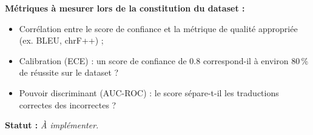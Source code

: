 \noindent\textbf{Métriques à mesurer lors de la constitution du dataset :}
\begin{itemize}
  \item Corrélation entre le score de confiance et la métrique de qualité
    appropriée (ex. BLEU, chrF++) ;
  \item Calibration (ECE) : un score de confiance de 0.8 correspond-il à
    environ 80\,\% de réussite sur le dataset ?
  \item Pouvoir discriminant (AUC-ROC) : le score sépare-t-il les traductions
    correctes des incorrectes ?
\end{itemize}

\noindent\textbf{Statut :} \textit{À implémenter.}


